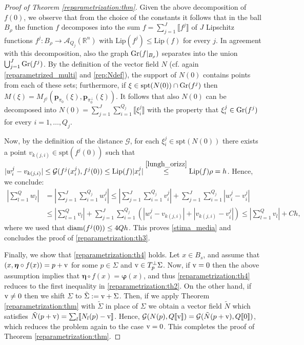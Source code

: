 \documentclass[a4paper,11pt,reqno]{amsart}
\theoremstyle{definition}
\numberwithin{equation}{section}
\numberwithin{subsection}{section}
\newcommand{\R}{\mathbb{R}}
\newcommand{\A}{\mathcal{A}}
\newcommand{\G}{\mathcal{G}}
\newcommand{\Lip}{\mathrm{Lip}}
\newcommand{\spt}{\mathrm{spt}}
\newcommand{\bphi}{\boldsymbol{\varphi}}
\newcommand{\bfeta}{\boldsymbol{\eta}}
\newcommand{\p}{\mathbf{p}}
\begin{document}
\begin{proof}[Proof of Theorem \ref{reparametrization:thm}]
Given the above decomposition of $f(0)$, we observe that from the choice of the constants it follows that in the ball $B_{\rho}$ the function $f$ decomposes into the sum $f = \sum_{j=1}^{J} \llbracket f^{j} \rrbracket$ of $J$ Lipschitz functions $f^{j} \colon B_{\rho} \to \A_{Q_{j}}(\R^{n})$ with $\Lip(f^{j}) \leq \Lip(f)$ for every $j$. In agreement with this decomposition, also the graph ${\rm Gr}(f|_{B_\rho})$ separates into the union $\bigcup_{j=1}^{J} {\rm Gr}(f^{j})$. By the definition of the vector field $N$ (cf. again \eqref{reparametrized_multi} and \eqref{rep:Ndef}), the support of $N(0)$ contains points from each of these sets; furthermore, if $\xi \in \spt(N(0)) \cap {\rm Gr}(f^{j})$ then $M(\xi) = M_{f^{j}}(\p_{\pi_0}(\xi), \p_{\pi_{0}^{\perp}}(\xi))$. It follows that also $N(0)$ can be decomposed into $N(0) = \sum_{j=1}^{J} \sum_{i=1}^{Q_{j}} \llbracket \xi^{j}_{i} \rrbracket$ with the property that $\xi^{j}_{i} \in {\rm Gr}(f^{j})$ for every $i = 1,\dots,Q_{j}$. 

Now, by the definition of the distance $\G$, for each $\xi^{j}_{i} \in \spt(N(0))$ there exists a point $v_{k(j,i)} \in \spt(f^{j}(0))$ such that $|w^{j}_{i} - v_{k(j,i)}| \leq \G(f^{j}(x^{j}_{i}), f^{j}(0)) \leq \Lip(f) |x^{j}_{i}| \overset{\eqref{lungh_orizz}}{\leq} \Lip(f) \rho = h$. Hence, we conclude:
\[
\begin{split}
\left| \sum_{l=1}^{Q} w_{l} \right| &= \left| \sum_{j=1}^{J} \sum_{i=1}^{Q_j} w^{j}_{i} \right| \leq \left| \sum_{j=1}^{J} \sum_{i=1}^{Q_j} v^{j}_{i} \right| + \sum_{j=1}^{J} \sum_{i=1}^{Q_j} |w^{j}_{i} - v^{j}_{i}| \\
&\leq \left| \sum_{l=1}^{Q} v_{l} \right| + \sum_{j=1}^{J} \sum_{i=1}^{Q_j} \left( |w^{j}_{i} - v_{k(j,i)}| + |v_{k(j,i)} - v^{j}_{i}| \right) \leq \left| \sum_{l=1}^{Q} v_{l} \right| + Ch,
\end{split}
\] 
where we used that ${\rm diam}(f^{j}(0)) \leq 4Qh$. This proves \eqref{stima_media} and concludes the proof of \eqref{reparametrization:th3}.

Finally, we show that \eqref{reparametrization:th4} holds. Let $x \in B_{s}$, and assume that $\left( x, \bfeta \circ f(x) \right) = p + {\rm v}$ for some $p \in \Sigma$ and ${\rm v} \in T_{p}^{\perp}\Sigma$. Now, if ${\rm v} = 0$ then the above assumption implies that $\bfeta \circ f(x) = \bphi(x)$, and thus \eqref{reparametrization:th4} reduces to the first inequality in \eqref{reparametrization:th2}. On the other hand, if ${\rm v} \neq 0$ then we shift $\Sigma$ to $\tilde{\Sigma} := {\rm v} + \Sigma$. Then, if we apply Theorem \ref{reparametrization:thm} with $\tilde{\Sigma}$ in place of $\Sigma$ we obtain a vector field $\tilde{N}$ which satisfies $\tilde{N}(p + {\rm v}) = \sum_{l} \llbracket N_{l}(p) - {\rm v} \rrbracket$. Hence, $\G(N(p), Q \llbracket {\rm v} \rrbracket) = \G(\tilde{N}(p+{\rm v}), Q \llbracket 0 \rrbracket)$, which reduces the problem again to the case ${\rm v} = 0$. This completes the proof of Theorem \ref{reparametrization:thm}. 
\end{proof}
\end{document}
